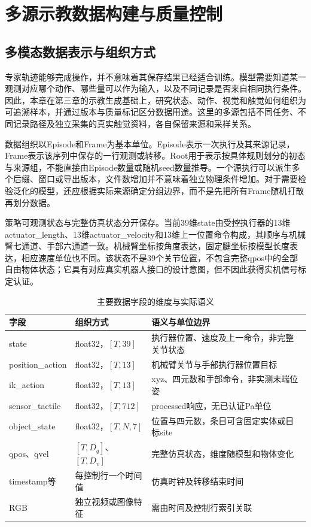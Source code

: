\chapter{多源示教数据构建与质量控制}
\label{chap:multimodal_data}

\section{多模态数据表示与组织方式}
\label{sec:data_representation}

专家轨迹能够完成操作，并不意味着其保存结果已经适合训练\cite{mandlekar2022demonstrations}。模型需要知道某一观测对应哪个动作、哪些量可以作为输入，以及不同记录是否来自相同执行条件。因此，本章在第三章的示教生成基础上，研究状态、动作、视觉和触觉如何组织为可追溯样本，并通过版本与质量标记区分数据用途。这里的多源包括不同任务、不同记录路径及独立采集的真实触觉资料，各自保留来源和采样关系。

数据组织以Episode和Frame为基本单位。Episode表示一次执行及其来源记录，Frame表示该序列中保存的一行观测或转移。Root用于表示按具体规则划分的初态与来源组，不能直接由Episode数量或随机seed数量推导。一个源执行可以派生多个后缀、窗口或导出版本，文件数增加并不意味着独立物理条件增加。对于需要检验泛化的模型，还应根据实际来源确定分组边界，而不是先把所有Frame随机打散再划分数据。

策略可观测状态与完整仿真状态分开保存。当前39维state由受控执行器的13维actuator\_length、13维actuator\_velocity和13维上一位置命令构成，其顺序与机械臂七通道、手部六通道一致。机械臂坐标按角度表达，固定腱坐标按模型长度表达，相应速度单位也不同。该状态不是39个关节位置，不包含完整qpos中的全部自由物体状态；它具有对应真实机器人接口的设计意图，但不因此获得实机信号标定认证。

\begin{table}[htbp]
 \centering\small
 \caption{主要数据字段的维度与实际语义}
 \label{tab:ch04_fields}
 \begin{tabular}{p{}p{}p{}}
 \hline
 字段 & 组织方式 & 语义与单位边界\\
 \hline
 state & float32，$[T,39]$ & 执行器位置、速度及上一命令，非完整关节状态\\
 position\_action & float32，$[T,13]$ & 机械臂关节与手部执行器位置目标\\
 ik\_action & float32，$[T,13]$ & xyz、四元数和手部命令，非实测末端位姿\\
 sensor\_tactile & float32，$[T,712]$ & processed响应，无已认证Pa单位\\
 object\_state & float32，$[T,N,7]$ & 位置与四元数，条目可含固定实体或目标site\\
 qpos、qvel & $[T,D_q]$、$[T,D_v]$ & 完整仿真状态，维度随模型和物体变化\\
 timestamp等 & 每控制行一个时间值 & 仿真时钟及转移结束时间\\
 RGB & 独立视频或图像特征 & 需由时间及控制行索引关联\\
 \hline
 \end{tabular}
\end{table}

